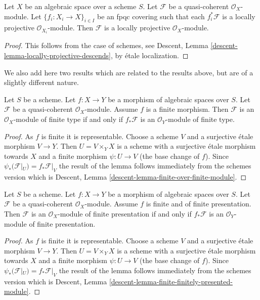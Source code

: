 \begin{lemma}
\label{lemma-locally-projective-descends}
Let $X$ be an algebraic space over a scheme $S$.
Let $\mathcal{F}$ be a quasi-coherent $\mathcal{O}_X$-module.
Let $\{f_i : X_i \to X\}_{i \in I}$ be an fpqc covering such that
each $f_i^*\mathcal{F}$ is a locally projective $\mathcal{O}_{X_i}$-module.
Then $\mathcal{F}$ is a locally projective $\mathcal{O}_X$-module.
\end{lemma}

\begin{proof}
This follows from the case of schemes, see
Descent, Lemma \ref{descent-lemma-locally-projective-descends},
by \'etale localization.
\end{proof}

\noindent
We also add here two results which are related to the results above, but
are of a slightly different nature.

\begin{lemma}
\label{lemma-finite-over-finite-module}
Let $S$ be a scheme.
Let $f : X \to Y$ be a morphism of algebraic spaces over $S$.
Let $\mathcal{F}$ be a quasi-coherent $\mathcal{O}_X$-module.
Assume $f$ is a finite morphism.
Then $\mathcal{F}$ is an $\mathcal{O}_X$-module of finite type
if and only if $f_*\mathcal{F}$ is an $\mathcal{O}_Y$-module of finite
type.
\end{lemma}

\begin{proof}
As $f$ is finite it is representable. Choose a scheme $V$ and a surjective
\'etale morphism $V \to Y$. Then $U = V \times_Y X$ is a scheme with
a surjective \'etale morphism towards $X$ and a finite morphism
$\psi : U \to V$ (the base change of $f$). Since
$\psi_*(\mathcal{F}|_U) = f_*\mathcal{F}|_V$
the result of the lemma follows immediately from the schemes version which
is
Descent, Lemma \ref{descent-lemma-finite-over-finite-module}.
\end{proof}

\begin{lemma}
\label{lemma-finite-finitely-presented-module}
Let $S$ be a scheme.
Let $f : X \to Y$ be a morphism of algebraic spaces over $S$.
Let $\mathcal{F}$ be a quasi-coherent $\mathcal{O}_X$-module.
Assume $f$ is finite and of finite presentation.
Then $\mathcal{F}$ is an $\mathcal{O}_X$-module of finite presentation
if and only if $f_*\mathcal{F}$ is an $\mathcal{O}_Y$-module of finite
presentation.
\end{lemma}

\begin{proof}
As $f$ is finite it is representable. Choose a scheme $V$ and a surjective
\'etale morphism $V \to Y$. Then $U = V \times_Y X$ is a scheme with
a surjective \'etale morphism towards $X$ and a finite morphism
$\psi : U \to V$ (the base change of $f$). Since
$\psi_*(\mathcal{F}|_U) = f_*\mathcal{F}|_V$
the result of the lemma follows immediately from the schemes version which
is
Descent, Lemma \ref{descent-lemma-finite-finitely-presented-module}.
\end{proof}







